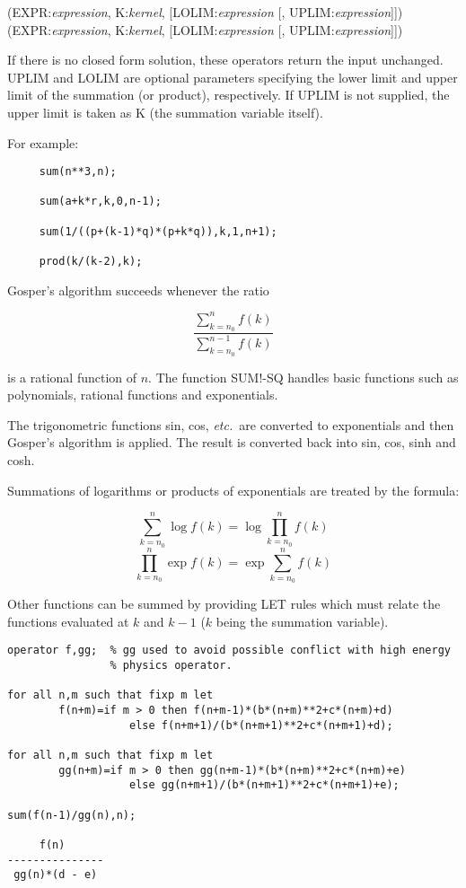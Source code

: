 \documentclass[11pt,letterpaper]{book}
\makeatletter
\newcommand{\underscore}{\_}
\newcommand{\ttindex}[1]{{\renewcommand{\_}{\protect\underscore}%
                          \index{#1@{\tt #1}}}}
\makeatother
\begin{document}
\vspace{.1in}
(EXPR:{\em expression}, K:{\em kernel},
[LOLIM:{\em expression} [, UPLIM:{\em expression}]]) \\
(EXPR:{\em expression}, K:{\em kernel},
[LOLIM:{\em expression} [, UPLIM:{\em expression}]])

If there is no closed form solution, these operators return the input
unchanged.  UPLIM and LOLIM are optional parameters specifying the lower
limit and upper limit of the summation (or product), respectively.  If UPLIM
is not supplied, the upper limit is taken as K (the summation variable
itself).

For example:

{\small\begin{verbatim}
     sum(n**3,n);

     sum(a+k*r,k,0,n-1);

     sum(1/((p+(k-1)*q)*(p+k*q)),k,1,n+1);

     prod(k/(k-2),k);
\end{verbatim}}

Gosper's algorithm succeeds whenever the ratio

\[ \frac{\sum_{k=n_0}^n f(k)}{\sum_{k=n_0}^{n-1} f(k)} \]

\noindent is a rational function of $n$.  The function SUM!-SQ
handles basic functions such as polynomials, rational functions and
exponentials.\ttindex{SUM-SQ}

The trigonometric functions sin, cos, {\em etc.\ }are converted to exponentials
and then Gosper's algorithm is applied.  The result is converted back into
sin, cos, sinh and cosh.

Summations of logarithms or products of exponentials are treated by the
formula:

\vspace{.1in}
\hspace*{2em} \[ \sum_{k=n_0}^{n} \log f(k) = \log \prod_{k=n_0}^n f(k) \]
\vspace{.1in}
\hspace*{2em} \[ \prod_{k=n_0}^n \exp f(k) = \exp \sum_{k=n_0}^n f(k) \]
\vspace{.1in}

Other functions can be summed by providing LET rules which must relate the
functions evaluated at $k$ and $k - 1$ ($k$ being the summation variable).

{\small\begin{verbatim}
operator f,gg;  % gg used to avoid possible conflict with high energy
                % physics operator.

for all n,m such that fixp m let
        f(n+m)=if m > 0 then f(n+m-1)*(b*(n+m)**2+c*(n+m)+d)
                   else f(n+m+1)/(b*(n+m+1)**2+c*(n+m+1)+d);

for all n,m such that fixp m let
        gg(n+m)=if m > 0 then gg(n+m-1)*(b*(n+m)**2+c*(n+m)+e)
                   else gg(n+m+1)/(b*(n+m+1)**2+c*(n+m+1)+e);

sum(f(n-1)/gg(n),n);

     f(n)
---------------
 gg(n)*(d - e)
\end{verbatim}}
\end{document}
